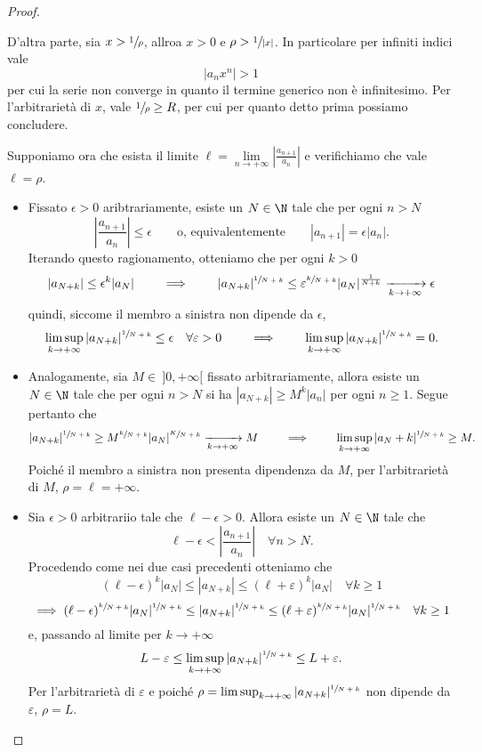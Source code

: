 \begin{proof}
\begin{itemize}[leftmargin = 50pt]
        D'altra parte, sia $x>\sfrac{1}{\rho}$, allroa $x>0$ e $\rho >\sfrac{1}{|x|}$. In particolare per infiniti indici vale 
        \[|a_nx^n|>1\]
        per cui la serie non converge in quanto il termine generico non è infinitesimo. Per l'arbitrarietà di $x$, vale $\sfrac{1}{\rho} \geq R$, per cui per quanto detto prima possiamo concludere.
    \end{itemize}
    Supponiamo ora che esista il limite $\ell = \lim\limits_{n \rightarrow+\infty}\left|\frac{a_{n+1}}{a_{n}}\right|$ e verifichiamo che vale $\ell = \rho$.
    \begin{itemize}[leftmargin = 50pt]
        \item[\boxed{\ell = 0}] Fissato $\epsilon >0$ aribtrariamente, esiste un $N\in \N$ tale che per ogni $n>N$ 
        \[\left|\frac{a_{n+1}}{a_n}\right|\leq \epsilon\qquad \text{o, equivalentemente}\qquad |a_{n+1}|=\epsilon|a_n|.\]
        Iterando questo ragionamento, otteniamo che per ogni $k>0$
        \[|a_{N+k}| \leq \epsilon ^k |a_N|\qquad \implies \qquad |a_{N+k}|^{\sfrac{1}{N+k}}\leq \varepsilon ^{\sfrac{k}{N+k}} |a_N|^{\frac{1}{N+k}}\xrightarrow[k\to+\infty]{} \epsilon\]
        quindi, siccome il membro a sinistra non dipende da $\epsilon$,
        \[\limsup_{k\to +\infty} |a_{N+k}|^{\sfrac{1}{N+k}}\leq \epsilon\quad \forall \varepsilon >0\qquad \implies \qquad \limsup_{k\to +\infty}|a_{N+k}|^{\sfrac{1}{N+k}} = 0.\]
        \item[\boxed{\ell = +\infty}] Analogamente, sia $M \in \ ]0,+\infty[$ fissato arbitrariamente, allora esiste un $N\in\N$ tale che per ogni $n>N$ si ha $|a_{N+k}|\geq M^k|a_n|$ per ogni $n\geq 1$. Segue pertanto che 
        \[|a_{N+k}|^{\sfrac{1}{N+k}} \geq M^{\sfrac{k}{N+k}}|a_N|^{\sfrac{K}{N+k}} \xrightarrow[k\to+\infty]{} M\qquad \implies \qquad \limsup_{k\to +\infty}|a_N+k|^{\sfrac{1}{N+k}}\geq M.\]
        Poiché il membro a sinistra non presenta dipendenza da $M$, per l'arbitrarietà di $M$, $\rho = \ell = +\infty$.
        \item[\boxed{\ell \in \R_{>0}}] Sia $\epsilon >0$ arbitrariio tale che $\ell -\epsilon >0$. Allora esiste un $N\in \N$ tale che
        \[\ell-\epsilon <\left|\frac{a_{n+1}}{a_n}\right|\quad \forall n>N.\]
        Procedendo come nei due casi precedenti otteniamo che 
        \[(\ell-\epsilon)^k|a_N| \leq |a_{N+k}| \leq (\ell +\varepsilon)^k |a_N|\quad \forall k\geq 1\]
        \[\implies (\ell-\epsilon)^{\sfrac{k}{N+k}}|a_N|^{\sfrac{1}{N+k}} \leq |a_{N+k}|^{\sfrac{1}{N+k}} \leq (\ell +\varepsilon)^{\sfrac{k}{N+k}} |a_N|^{\sfrac{1}{N+k}}\quad \forall k\geq 1\]
        e, passando al limite per $k\to +\infty$
        \[L-\varepsilon \leq \limsup_{k\to +\infty}|a_{N+k}|^{\sfrac{1}{N+k}}\leq L+\varepsilon.\]
        Per l'arbitrarietà di $\varepsilon$ e poiché $\rho = \limsup_{k\to +\infty}|a_{N+k}|^{\sfrac{1}{N+k}}$ non dipende da $\varepsilon$, $\rho = L$.\qedhere
    \end{itemize}
\end{proof}

